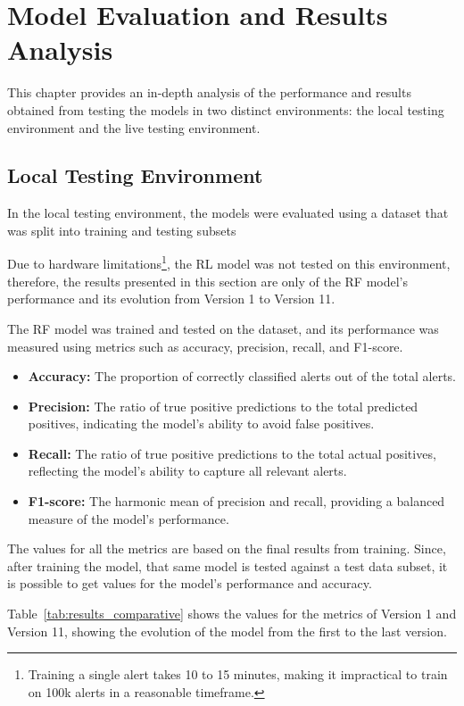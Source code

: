 \chapter{Model Evaluation and Results Analysis}
\label{chap:Chapter4}

This chapter provides an in-depth analysis of the performance and results obtained from testing the models in two distinct environments: the local testing environment and the live testing environment.

\section{Local Testing Environment}

In the local testing environment, the models were evaluated using a dataset that was split into training and testing subsets

Due to hardware limitations\footnote{Training a single alert takes 10 to 15 minutes, making it impractical to train on 100k alerts in a reasonable timeframe.}, the RL model was not tested on this environment, therefore, the results presented in this section are only of the RF model's performance and its evolution from Version 1 to Version 11.

The RF model was trained and tested on the dataset, and its performance was measured using metrics such as accuracy, precision, recall, and F1-score.
\begin{itemize}
    \item \textbf{Accuracy:} The proportion of correctly classified alerts out of the total alerts.
    \item \textbf{Precision:} The ratio of true positive predictions to the total predicted positives, indicating the model's ability to avoid false positives.
    \item \textbf{Recall:} The ratio of true positive predictions to the total actual positives, reflecting the model's ability to capture all relevant alerts.
    \item \textbf{F1-score:} The harmonic mean of precision and recall, providing a balanced measure of the model's performance.
\end{itemize}

The values for all the metrics are based on the final results from training. 
Since, after training the model, that same model is tested against a test data subset, it is possible to get values for the model's performance and accuracy.

Table~\ref{tab:results_comparative} shows the values for the metrics of Version 1 and Version 11, showing the evolution of the model from the first to the last version.

